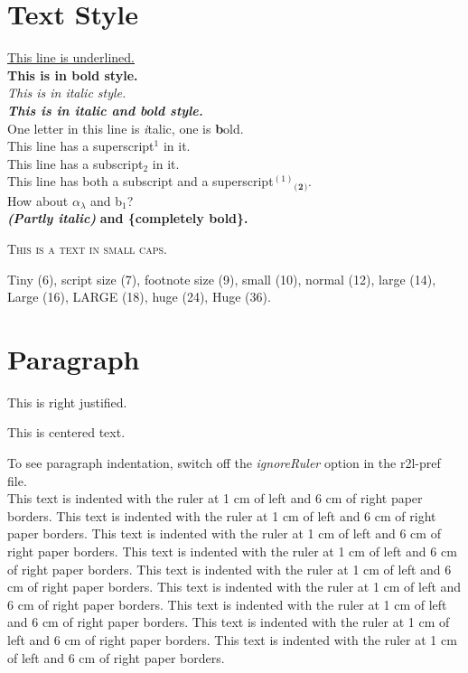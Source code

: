 \documentclass{article}
\begin{document}
\section*{Text Style}
{\underline {This line is underlined.}}\\{}
\textbf{This is in bold style.}\\{}
\textit{This is in italic style.}\\{}
\textbf{\textit{This is in italic and bold style.}}\\{}
One letter in this line is \textit{i}talic, one is \textbf{b}old.\\{}
This line has a superscript$^{1}$ in it.\\{}
This line has a subscript$_{2}$ in it.\\{}
This line has both a subscript and a superscript$^{(1)}$$_{(}$$_{\mathbf{2}}$$_{)}$.\\{}
How about \ensuremath{\alpha}$_{\ensuremath{\lambda}}$ and b$_{1}$?\\{}
\textbf{\textit{(Partly italic)}} \textbf{and \{completely bold\}.}


\textsc{This is a text in small caps.}

{\scriptsize Tiny (6),} {\footnotesize script size (7),} {\small footnote size (9),} small 
(10), normal (12), {\large large (14),} {\Large Large (16),} {\LARGE LARGE (18),} {\huge huge 
(24),} {\Huge Huge (36).}



\section*{Paragraph}

\begin{flushright}
This is right justified.


\end{flushright}

\begin{center}
This is centered text.


\end{center}

To see paragraph indentation, switch off the \textit{ignoreRuler} 
option in the r2l-pref file.\\{}
This text is indented with the ruler at 1 cm of left and 6 cm 
of right paper borders. This text is indented with the ruler at 
1 cm of left and 6 cm of right paper borders. This text is indented with 
the ruler at 1 cm of left and 6 cm of right paper borders. This 
text is indented with the ruler at 1 cm of left and 6 cm of right 
paper borders. This text is indented with the ruler at 1 cm of 
left and 6 cm of right paper borders. This text is indented with 
the ruler at 1 cm of left and 6 cm of right paper borders. This 
text is indented with the ruler at 1 cm of left and 6 cm of right 
paper borders. This text is indented with the ruler at 1 cm of 
left and 6 cm of right paper borders. This text is indented with 
the ruler at 1 cm of left and 6 cm of right paper borders.
\end{document}
